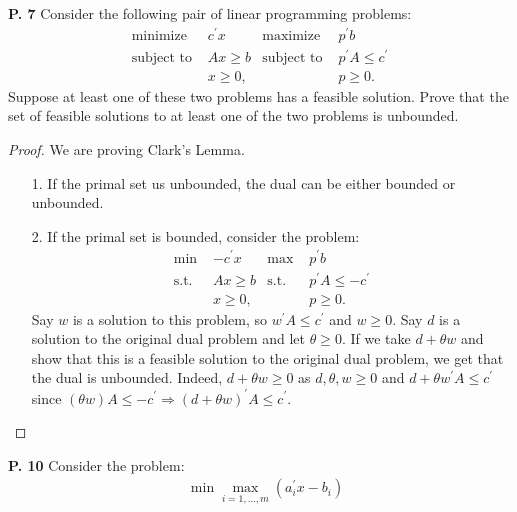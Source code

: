 \documentclass{article}
\begin{document}
\begin{jacklist}
\begin{framed}
    \item [\textbf{P. 7}] Consider the following pair of linear programming problems:
        \begin{align*}
            \text{minimize } & c^{\prime} x & \text{maximize } & p^{\prime} b \\
            \text{subject to } & A x \geq b & \text{subject to } & p^{\prime} A \leq c^{\prime} \\
            & x \geq 0, & & p \geq 0 .
        \end{align*}
        Suppose at least one of these two problems has a feasible solution. Prove that the set of feasible solutions to at least 
        one of the two problems is unbounded.
    \end{framed}
    \begin{proof}
        We are proving Clark's Lemma. \\
        \begin{itemize}
            \item [1.] If the primal set us unbounded, the dual can be either bounded or unbounded. 
            \item [2.] If the primal set is bounded, consider the problem: 
                \begin{align*}
                    \text{min } & -c^\prime x & \text{max } & p^\prime b \\
                    \text{s.t. } & Ax \geq b & \text{s.t.} & p^\prime A \leq -c^\prime \\
                                 &x \geq 0, & & p \geq 0. 
                \end{align*} 
                Say $w$ is a solution to this problem, so $w^\prime A \leq c^\prime$ and $w \geq 0$. Say $d$ is a solution 
                to the original dual problem and let $\theta \geq 0$. If we take $d + \theta w$ and show that this is a feasible 
                solution to the original dual problem, we get that the dual is unbounded. Indeed, $d + \theta w \geq 0$ as 
                $d, \theta, w \geq 0$ and $d + \theta w^\prime A \leq c^\prime$ since $(\theta w)A \leq -c^\prime 
                \Rightarrow (d + \theta w)^\prime A \leq c^\prime$.
        \end{itemize} 
    \end{proof}
\newpage
    \begin{framed} 
    \item [\textbf{P. 10}] Consider the problem: 
        \begin{align*}
            & \min \max _{i=1, \ldots, m}\left(a_{i}^{\prime} x-b_{i}\right) \\

\end{align*}
\end{framed}
\end{jacklist}
\end{document}
